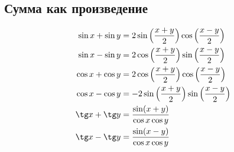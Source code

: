 \subsection*{Сумма как произведение}

\begin{align*}
  \sin x + \sin y &= 2 \sin \Big( \frac{x + y}{2} \Big) \cos \Big( \frac{x - y}{2} \Big)\\
  \sin x - \sin y &= 2 \cos \Big( \frac{x + y}{2} \Big) \sin \Big( \frac{x - y}{2} \Big)\\
  \cos x + \cos y &= 2 \cos \Big( \frac{x + y}{2} \Big) \cos \Big( \frac{x - y}{2} \Big)\\
  \cos x - \cos y &= -2 \sin \Big( \frac{x + y}{2} \Big) \sin \Big( \frac{x - y}{2} \Big)\\
  \tg x + \tg y &= \frac{ \sin(x + y) }{ \cos x \cos y}\\
  \tg x - \tg y &= \frac{ \sin(x - y) }{ \cos x \cos y}\\
\end{align*}